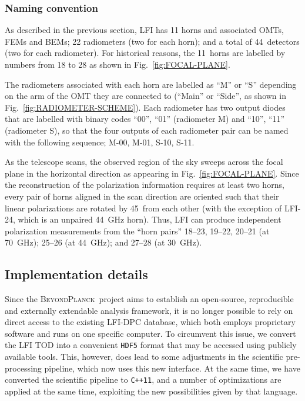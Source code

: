 \documentclass[onecolumn]{aa}
\newcommand{\BP}{\textsc{BeyondPlanck}}
\begin{document}
	



\subsubsection{Naming convention}

As described in the previous section, LFI has 11 horns and
associated OMTs, FEMs and BEMs; 22 radiometers (two for each horn);
and a total of 44~detectors (two for each radiometer). For historical
reasons, the 11~horns are labelled by numbers from 18 to 28 as shown
in Fig.~\ref{fig:FOCAL-PLANE}.

The radiometers associated with each horn are labelled as ``M'' or
``S'' depending on the arm of the OMT they are connected to (``Main''
or ``Side'', as shown in Fig.~\ref{fig:RADIOMETER-SCHEME}). Each
radiometer has two output diodes that are labelled with binary codes
``00'', ``01'' (radiometer M) and ``10'', ``11'' (radiometer S), so
that the four outputs of each radiometer pair can be named with the
following sequence; M-00, M-01, S-10, S-11.

As the telescope scans, the observed region of the sky sweeps across
the focal plane in the horizontal direction as appearing in
Fig.~\ref{fig:FOCAL-PLANE}. Since the reconstruction of the
polarization information requires at least two horns, every pair of
horns aligned in the scan direction are oriented such that their
linear polarizations are rotated by 45\deg\ from each other (with the
exception of LFI-24, which is an unpaired 44~GHz horn). Thus, LFI can
produce independent polarization measurements from the ``horn pairs''
18--23, 19--22, 20--21 (at 70~GHz); 25--26 (at 44~GHz); and 27--28 (at
30~GHz).
	
	
	
	
		

\subsection{Implementation details}

Since the \BP\ project aims to establish an open-source, reproducible
and externally extendable analysis framework, it is no longer possible
to rely on direct access to the existing LFI-DPC database, which both
employs proprietary software and runs on one specific computer. To
circumvent this issue, we convert the LFI TOD into a convenient
\texttt{HDF5} format \citep{bp03} that may be accessed using publicly
available tools. This, however, does lead to some adjustments in the
scientific pre-processing pipeline, which now uses this new interface.
At the same time, we have converted the scientific pipeline to
\texttt{C++11}, and a number of optimizations are applied at the same
time, exploiting the new possibilities given by that language.
\end{document}
